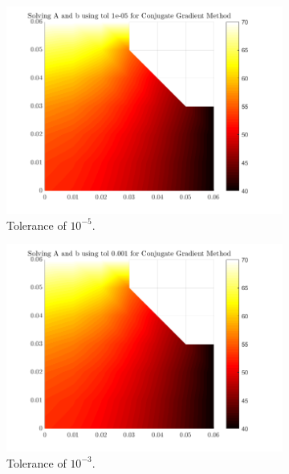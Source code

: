 \documentclass[12pt,a4paper]{article}
\begin{document}
\begin{figure}[H]
	\centering
	\begin{subfigure}[b]{0.48\textwidth}
		\centering
		\includegraphics[width=\linewidth]{images/ConjugateComparisontole-05.png}
		\caption{Tolerance of $10^{-5}$.}
		\label{fig:Conjugatetole-05}
	\end{subfigure}
	\hfill
	\begin{subfigure}[b]{0.48\textwidth}
		\centering
		\includegraphics[width=\linewidth]{images/ConjugateComparisontol0-001.png}
		\caption{Tolerance of $10^{-3}$.}
		\label{fig:Conjugatetol0.001}
	\end{subfigure}
	\hfill
	\begin{subfigure}[b]{0.48\textwidth}

\end{subfigure}
\end{figure}
\end{document}
